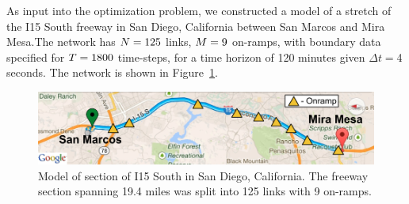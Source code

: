 As input into the optimization problem, we constructed a model of
a  stretch of the I15 South freeway in San Diego,
California between San Marcos and Mira Mesa.The network has $N=125$ links, $M=9$ on-ramps,
with boundary data specified for $T=1800$ time-steps,
for a time horizon of 120 minutes given $\Delta t=$4 seconds.
The network is shown in Figure~\ref{fig:Model-of-section}.
\begin{figure}
\begin{centering}
\includegraphics[width=0.7\columnwidth]{images/map}
\par\end{centering}

\caption{Model of section of I15 South in San Diego, California. The freeway
section spanning 19.4 miles was split into 125 links with 9 on-ramps.\label{fig:Model-of-section}}
\end{figure}



